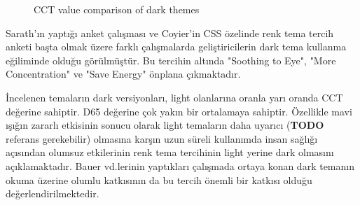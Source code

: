 \documentclass{article}
\begin{document}
\begin{figure}[h]
  \caption{CCT value comparison of dark themes}
  \label{fig:dark-compare}
\end{figure}

Sarath'ın yaptığı anket çalışması \cite{sarath2016prefer} ve Coyier'in CSS özelinde renk tema tercih anketi \cite{coyier2013poll} başta olmak üzere farklı çalışmalarda geliştiricilerin dark tema kullanma eğiliminde olduğu görülmüştür. Bu tercihin altında "Soothing to Eye", "More Concentration" ve "Save Energy" önplana çıkmaktadır.

İncelenen temaların dark versiyonları, light olanlarına oranla yarı oranda CCT değerine sahiptir. D65 değerine çok yakın bir ortalamaya sahiptir. Özellikle mavi ışığın zararlı etkisinin sonucu olarak light temaların daha uyarıcı (\textbf{TODO} referans gerekebilir) olmasına karşın uzun süreli kullanımda insan sağlığı açısından olumsuz etkilerinin renk tema tercihinin light yerine dark olmasını açıklamaktadır. Bauer vd.lerinin \cite{bauer1980improving} yaptıkları çalışmada ortaya konan dark temanın okuma üzerine olumlu katkısının da bu tercih önemli bir katkısı olduğu değerlendirilmektedir.

\begin{comment}
Implications – The study indicates that individuals use Dark Mode for a more satisfying user experience as they feel e.g. less eye strain with a dark themed user interface. Editing and coding software is mostly designed in a light-on-dark color scheme, as users often work for long continuous hours on screen, surrounded by dark environment. As screen time per individual increases, more users are experiencing ocular diseases. In counteraction, society demanded dark themed interfaces for operating systems, websites, and apps. As individuals were already using unofficial dark themes on different interfaces, tech companies started releasing system updates to make Dark Mode a choice. As Apple released their user interface update just in 2019, Dark Mode is still a relevant trend discussed in the industry and society. Experts indicate that Dark Mode is here to stay, as it satisfies preferences of many users and makes current OLED screens and future digital devices with appropriate display technology more sustainable \cite{eisfeld2020rise}
\end{comment}
\end{document}
